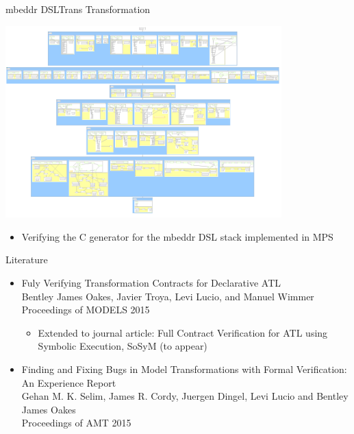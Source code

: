 \documentclass[12pt, handout]{beamer}
\begin{document}
\begin{frame}{mbeddr DSLTrans Transformation}
\begin{center}
\includegraphics[width=0.8\textwidth]{figures/mbeddr}
\end{center}

\begin{itemize}
\item Verifying the C generator for the mbeddr DSL stack implemented in MPS
\end{itemize}
\end{frame}

\begin{frame}{Literature}
\small
\begin{itemize}[<+->]

\item Fuly Verifying Transformation Contracts for Declarative ATL\\
Bentley James Oakes, Javier Troya, Levi Lucio, and Manuel Wimmer\\
Proceedings of MODELS 2015
\begin{itemize}
\item Extended to journal article: Full Contract Verification for ATL using Symbolic Execution, SoSyM (to appear)
\end{itemize}
\item  Finding and Fixing Bugs in Model Transformations with Formal Verification: An Experience Report\\
Gehan M. K. Selim, James R. Cordy, Juergen Dingel, Levi Lucio and Bentley James Oakes\\
Proceedings of AMT 2015
\end{itemize}
\end{frame}
\end{document}
